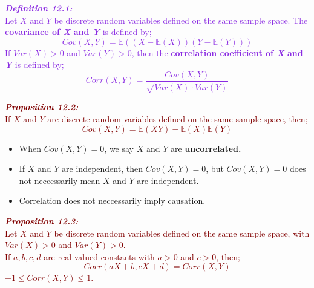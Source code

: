 \documentclass{report}
\newenvironment{cframed}[1][BlueViolet]
  {\begin{tcolorbox}[colframe=#1,colback=white]}
  {\end{tcolorbox}}
\newenvironment{cframedprop}[1][Maroon]
  {\begin{tcolorbox}[colframe=#1,colback=white]}
  {\end{tcolorbox}}
\begin{document}
\begin{cframed}
    \textcolor{BlueViolet}{\textbf{\textit{Definition 12.1:}}\\
    Let $X$ and $Y$ be discrete random variables defined on the same sample space. The \textbf{covariance of \textit{X} and \textit{Y}} is defined by;
    \begin{equation}
        Cov(X,Y) = \mathbb{E}((X - \mathbb{E}(X))(Y - \mathbb{E}(Y)))
    \end{equation}
    If $Var(X) > 0$ and $Var(Y) > 0$, then the \textbf{correlation coefficient of \textit{X} and \textit{Y}} is defined by;
    \begin{equation}
        Corr(X,Y) = \frac{Cov(X,Y)}{\sqrt{Var(X)\cdot Var(Y)}}
    \end{equation}}
\end{cframed}

\begin{cframedprop}
    \textcolor{Maroon}{\textbf{\textit{Proposition 12.2:}}\\
    If $X$ and $Y$ are discrete random variables defined on the same sample space, then;
    \begin{equation}
        Cov(X,Y) = \mathbb{E}(XY) - \mathbb{E}(X)\mathbb{E}(Y)
    \end{equation}}
\end{cframedprop}
\begin{itemize}
    \item When $Cov(X,Y) = 0$, we say $X$ and $Y$ are \textbf{uncorrelated.}
    \item If $X$ and $Y$ are independent, then $Cov(X,Y) = 0$, but $Cov(X,Y) = 0$ does not neccessarily mean $X$ and $Y$ are independent.
    \item Correlation does not neccessarily imply causation.
\end{itemize}

\begin{cframedprop}
    \textcolor{Maroon}{\textbf{\textit{Proposition 12.3:}}\\
    Let $X$ and $Y$ be discrete random variables defined on the same sample space, with $Var(X) > 0$ and $Var(Y) > 0$.\\
    If $a,b,c,d$ are real-valued constants with $a > 0$ and $c > 0$, then;
    \begin{equation}
        Corr(aX + b, cX + d) = Corr(X,Y)
    \end{equation}
    $-1 \leq Corr(X,Y) \leq 1$.}
\end{cframedprop}
\end{document}
